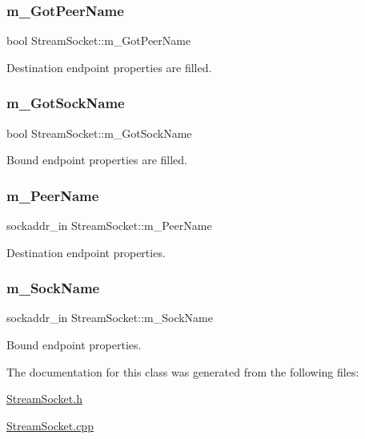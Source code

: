 \subsubsection{\texorpdfstring{m\+\_\+\+Got\+Peer\+Name}{m\_GotPeerName}}
{\footnotesize\ttfamily bool Stream\+Socket\+::m\+\_\+\+Got\+Peer\+Name\hspace{0.3cm}{\ttfamily [protected]}}



Destination endpoint properties are filled. 

\mbox{\label{classStreamSocket_a4f019df008ee69c34332f0e08c68d746}} 
\subsubsection{\texorpdfstring{m\+\_\+\+Got\+Sock\+Name}{m\_GotSockName}}
{\footnotesize\ttfamily bool Stream\+Socket\+::m\+\_\+\+Got\+Sock\+Name\hspace{0.3cm}{\ttfamily [protected]}}



Bound endpoint properties are filled. 

\mbox{\label{classStreamSocket_a4ab3bf06cf2d7866f36091258d3bd20a}} 
\subsubsection{\texorpdfstring{m\+\_\+\+Peer\+Name}{m\_PeerName}}
{\footnotesize\ttfamily sockaddr\+\_\+in Stream\+Socket\+::m\+\_\+\+Peer\+Name\hspace{0.3cm}{\ttfamily [protected]}}



Destination endpoint properties. 

\mbox{\label{classStreamSocket_a3d9ba37dc44b6ebcbb836f1aeb90ec74}} 
\subsubsection{\texorpdfstring{m\+\_\+\+Sock\+Name}{m\_SockName}}
{\footnotesize\ttfamily sockaddr\+\_\+in Stream\+Socket\+::m\+\_\+\+Sock\+Name\hspace{0.3cm}{\ttfamily [protected]}}



Bound endpoint properties. 



The documentation for this class was generated from the following files\+:\begin{DoxyCompactItemize}
\item 
\hyperlink{StreamSocket_8h}{Stream\+Socket.\+h}\item 
\hyperlink{StreamSocket_8cpp}{Stream\+Socket.\+cpp}\end{DoxyCompactItemize}
